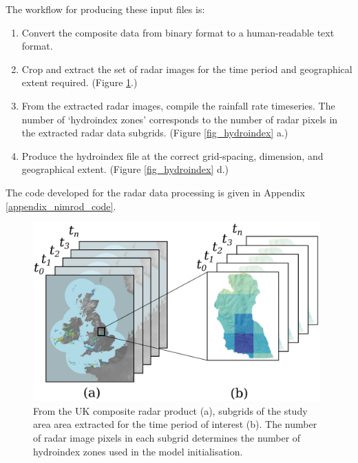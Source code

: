 The workflow for producing these input files is:
\begin{enumerate}
\item Convert the composite data from binary format to a human-readable text format.
\item Crop and extract the set of radar images for the time period and geographical extent required. (Figure \ref{fig_radar_extract}.)
\item From the extracted radar images, compile the rainfall rate timeseries. The number of `hydroindex zones' corresponds to the number of radar pixels in the extracted radar data subgrids. (Figure \ref{fig_hydroindex} a.)
\item Produce the hydroindex file at the correct grid-spacing, dimension, and geographical extent. (Figure \ref{fig_hydroindex} d.)
\end{enumerate}

The code developed for the radar data processing is given in Appendix \ref{appendix_nimrod_code}.

\begin{figure}[htb]
\includegraphics[width=11cm]{chp_radar/cropradar.eps}
\caption{From the UK composite radar product (a), subgrids of the study area area extracted for the time period of interest (b). The number of radar image pixels in each subgrid determines the number of hydroindex zones used in the model initialisation.}
\label{fig_radar_extract}
\end{figure}

